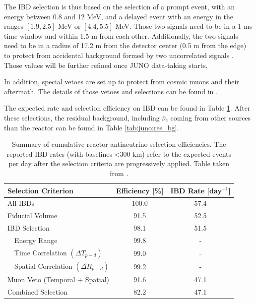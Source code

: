 \documentclass[../main.tex]{subfiles}
\begin{document}
The IBD selection is thus based on the selection of a prompt event, with an energy between 0.8 and 12 MeV, and a delayed event with an energy in the ranges $[1.9, 2.5]$ MeV or $[4.4, 5.5]$ MeV. Those two signals need to be in a 1 ms time window and within 1.5 m from each other. Additionally, the two signals need to be in a radius of 17.2 m from the detector center (0.5 m from the edge) to protect from accidental background formed by two uncorrelated signals \cite{abusleme_potential_2024}. Those values will be further refined once JUNO data-taking starts.

In addition, special vetoes are set up to protect from cosmic muons and their aftermath. The details of those vetoes and selections can be found in \cite{abusleme_potential_2024}.

The expected rate and selection efficiency on IBD can be found in Table \ref{tab:juno:ibd_selection}. After these selections, the residual background, including $\bar{\nu}_e$ coming from other sources than the reactor can be found in Table \ref{tab:juno:res_bg}.

\begin{table}[ht]
  \centering
  \begin{tabular}{l|c|c}
    \hline
    Selection Criterion & Efficiency [\%] & IBD Rate [day$^{-1}$] \\
    \hline
    All IBDs            & 100.0           & 57.4 \\
    Fiducial Volume     & 91.5            & 52.5 \\
    IBD Selection       & 98.1            & 51.5 \\
    ~~Energy Range      & 99.8            & - \\
    ~~Time Correlation $(\Delta T_{p - d})$    & 99.0    & - \\
    ~~Spatial Correlation $(\Delta R_{p - d})$ & 99.2    & - \\
    Muon Veto (Temporal + Spatial)        & 91.6    & 47.1 \\
    \hline
    Combined Selection & 82.2             &47.1 \\
    \hline
  \end{tabular}
  \caption{Summary of cumulative reactor antineutrino selection efficiencies. The reported IBD rates (with baselines <300 km) refer to the expected events per day after the selection criteria are progressively applied. Table taken from \cite{abusleme_potential_2024}.}
  \label{tab:juno:ibd_selection}
\end{table}
\end{document}
